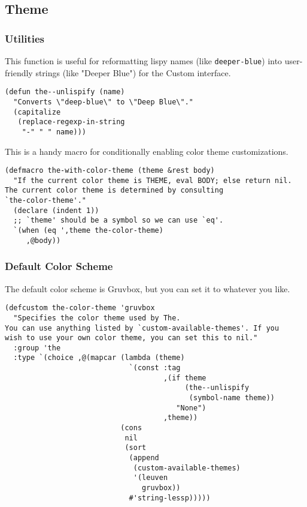 \documentclass[11pt]{article}
\begin{document}
\subsection{Theme}
\label{sec:org2665d5c}
\subsubsection{Utilities}
\label{sec:org3f2d474}

This function is useful for reformatting lispy names (like
\texttt{deeper-blue}) into user-friendly strings (like "Deeper Blue") for
the Custom interface.
\begin{verbatim}
(defun the--unlispify (name)
  "Converts \"deep-blue\" to \"Deep Blue\"."
  (capitalize
   (replace-regexp-in-string
    "-" " " name)))
\end{verbatim}

This is a handy macro for conditionally enabling color theme
customizations.
\begin{verbatim}
(defmacro the-with-color-theme (theme &rest body)
  "If the current color theme is THEME, eval BODY; else return nil.
The current color theme is determined by consulting
`the-color-theme'."
  (declare (indent 1))
  ;; `theme' should be a symbol so we can use `eq'.
  `(when (eq ',theme the-color-theme)
     ,@body))
\end{verbatim}

\subsubsection{Default Color Scheme}
\label{sec:org81fcd73}

The default color scheme is Gruvbox, but you can set it to whatever
you like.

\begin{verbatim}
(defcustom the-color-theme 'gruvbox
  "Specifies the color theme used by The.
You can use anything listed by `custom-available-themes'. If you
wish to use your own color theme, you can set this to nil."
  :group 'the
  :type `(choice ,@(mapcar (lambda (theme)
                             `(const :tag
                                     ,(if theme
                                          (the--unlispify
                                           (symbol-name theme))
                                        "None")
                                     ,theme))
                           (cons
                            nil
                            (sort
                             (append
                              (custom-available-themes)
                              '(leuven
                                gruvbox))
                             #'string-lessp)))))
\end{verbatim}
\end{document}
